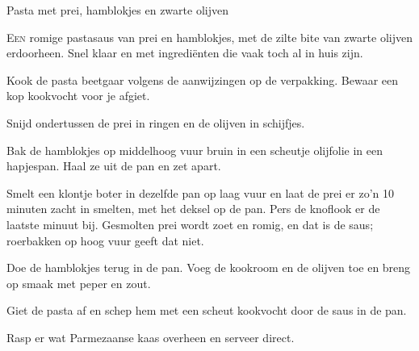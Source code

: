 \begin{recipe}{Pasta met prei, hamblokjes en zwarte olijven}


\lettrine{E}{en} romige pastasaus van prei en hamblokjes, met de zilte bite
van zwarte olijven erdoorheen. Snel klaar en met ingrediënten die vaak toch
al in huis zijn.

\begin{ingredients}
\end{ingredients}

\begin{steps}
  \item Kook de pasta beetgaar volgens de aanwijzingen op de verpakking. Bewaar
        een kop kookvocht voor je afgiet.
  \item Snijd ondertussen de prei in ringen en de olijven in schijfjes.
  \item Bak de hamblokjes op middelhoog vuur bruin in een scheutje olijfolie in
        een hapjespan. Haal ze uit de pan en zet apart.
  \item Smelt een klontje boter in dezelfde pan op laag vuur en laat de prei
        er zo'n 10 minuten zacht in smelten, met het deksel op de pan. Pers de
        knoflook er de laatste minuut bij. Gesmolten prei wordt zoet en romig,
        en dat is de saus; roerbakken op hoog vuur geeft dat niet.
  \item Doe de hamblokjes terug in de pan. Voeg de kookroom en de olijven toe
        en breng op smaak met peper en zout.
  \item Giet de pasta af en schep hem met een scheut kookvocht door de saus in
        de pan.
  \item Rasp er wat Parmezaanse kaas overheen en serveer direct.
\end{steps}

\end{recipe}
